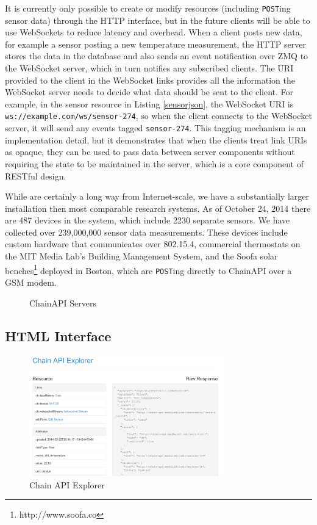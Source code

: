\documentclass{acm_proc_article-sp}
\begin{document}
It is currently only possible to create or modify resources (including
\texttt{POST}ing sensor data) through the HTTP interface, but in the future clients
will be able to use WebSockets to reduce latency and overhead. When a client
posts new data, for example a sensor posting a new temperature measurement, the
HTTP server stores the data in the database and also sends an event
notification over ZMQ to the WebSocket server, which in turn notifies any
subscribed clients. The URI provided to the client in the WebSocket links
provides all the information the WebSocket server needs to decide what data
should be sent to the client. For example, in the sensor resource in Listing
\ref{sensorjson}, the WebSocket URI is \texttt{ws://example.com/ws/sensor-274},
so when the client connects to the WebSocket server, it will send any events
tagged \texttt{sensor-274}. This tagging mechanism is an implementation detail,
but it demonstrates that when the clients treat link URIs as opaque, they can
be used to pass data between server components without requiring the state to
be maintained in the server, which is a core component of RESTful design.

While are certainly a long way from Internet-scale, we have a substantially
larger installation then most comparable research systems. As of October 24,
2014 there are 487 devices in the system, which include 2230 separate sensors.
We have collected over 239,000,000 sensor data measurements. These devices
include custom hardware that communicates over 802.15.4, commercial thermostats
on the MIT Media Lab's Building Management System, and the Soofa solar
benches\footnote{http://www.soofa.co} deployed in Boston, which are
\texttt{POST}ing directly to ChainAPI over a GSM modem.

\begin{figure}
    \centering
    
    \caption{ChainAPI Servers}
    \label{chain_actual}
\end{figure}

\subsection{HTML Interface}

\begin{figure}
    \centering
    \includegraphics[width=8.45cm, frame]{chain_explorer2}
    \caption{Chain API Explorer}
    \label{chain_explorer}
\end{figure}
\end{document}
